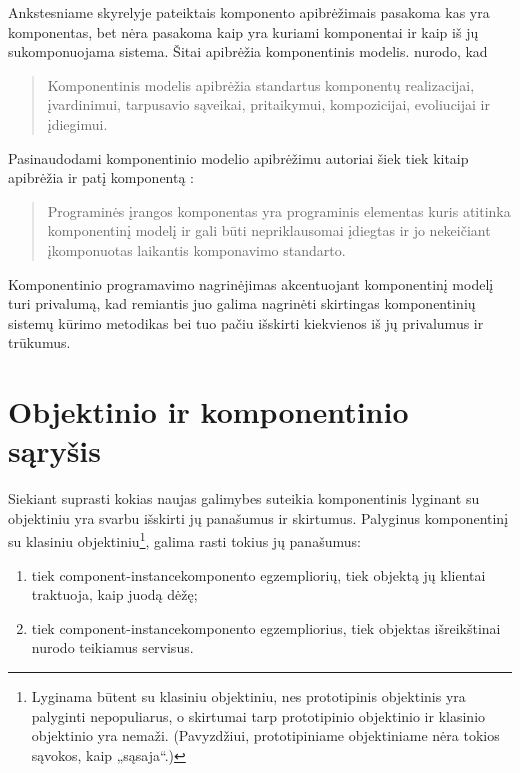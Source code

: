 \label{section:component:model}

Ankstesniame skyrelyje pateiktais komponento apibrėžimais pasakoma kas
yra komponentas, bet nėra pasakoma kaip yra kuriami komponentai ir kaip
iš jų sukomponuojama sistema. Šitai apibrėžia komponentinis
modelis. \cite[37]{heineman2001component} nurodo, kad
\begin{quote}
  Komponentinis modelis apibrėžia standartus komponentų realizacijai,
  įvardinimui, tarpusavio sąveikai, pritaikymui, kompozicijai,
  evoliucijai ir įdiegimui.
\end{quote}
Pasinaudodami komponentinio modelio apibrėžimu autoriai šiek tiek
kitaip apibrėžia ir patį komponentą \cite[7]{heineman2001component}:
\begin{quote}
  Programinės įrangos komponentas yra programinis elementas kuris
  atitinka komponentinį modelį ir gali būti nepriklausomai įdiegtas
  ir jo nekeičiant įkomponuotas laikantis komponavimo standarto.
\end{quote}

Komponentinio programavimo nagrinėjimas akcentuojant komponentinį modelį
turi privalumą, kad remiantis juo galima nagrinėti skirtingas
komponentinių sistemų kūrimo metodikas bei tuo pačiu išskirti
kiekvienos iš jų privalumus ir trūkumus.

\section{Objektinio ir komponentinio sąryšis}

Siekiant suprasti kokias naujas galimybes suteikia komponentinis
lyginant su objektiniu yra svarbu išskirti jų panašumus ir skirtumus.
Palyginus komponentinį su klasiniu objektiniu\footnote{Lyginama
būtent su klasiniu objektiniu, nes prototipinis objektinis yra
palyginti nepopuliarus, o skirtumai tarp prototipinio objektinio
ir klasinio objektinio yra nemaži. (Pavyzdžiui, prototipiniame
objektiniame nėra tokios sąvokos, kaip „sąsaja“.)}, galima rasti
tokius jų panašumus:
\begin{enumerate}
  \item tiek \gls{component-instance}{komponento egzempliorių}, tiek
    objektą jų klientai traktuoja, kaip juodą dėžę;
  \item tiek \gls{component-instance}{komponento egzempliorius}, tiek
    objektas išreikštinai nurodo teikiamus servisus.
\end{enumerate}

